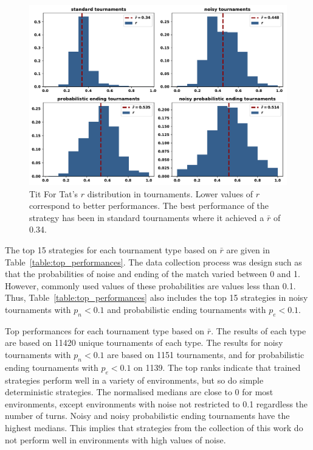 \documentclass{article}
\begin{document}
\begin{figure}[!htbp]
    \centering
    \includegraphics[width=.60\textwidth]{../images/tit_for_tat_r_distributions.pdf}
    \caption{Tit For Tat's $r$ distribution in tournaments. Lower values of \(r\)
    correspond to better performances. The best performance
    of the strategy has been in standard tournaments where it achieved a $\bar{r}$
    of 0.34.}
    \label{fig:tit_for_tat_r_distribution}
\end{figure}

The top 15 strategies for each tournament type based on \(\bar{r}\) are given in
Table~\ref{table:top_performances}. The data collection process was design such
as that the probabilities of noise and ending of the match varied between 0 and
1. However, commonly used values of these probabilities are
values less than 0.1. Thus,
Table~\ref{table:top_performances} also includes the top 15 strategies in noisy
tournaments with \(p_n < 0.1\) and probabilistic ending tournaments with \(p_e <
0.1\).

\begin{table}[!htbp]
    \begin{center}
    \resizebox{\textwidth}{!}{
        
    }
\end{center}
\caption{Top performances for each tournament type based on $\bar{r}$. The
results of each type are based on 11420 unique tournaments of each type. The
results for noisy tournaments with \(p_n < 0.1\) are based on 1151 tournaments,
and for probabilistic ending tournaments with \(p_e < 0.1\) on 1139. The top
ranks indicate that trained strategies perform well in a variety of
environments, but so do simple deterministic strategies. The normalised medians
are close to 0 for most environments, except environments with noise not
restricted to 0.1 regardless the number of turns. Noisy and noisy probabilistic
ending tournaments have the highest medians. This implies that strategies from
the collection of this work do not perform well in environments with high values
of noise.}
\label{table:top_performances}
\end{table}
\end{document}
